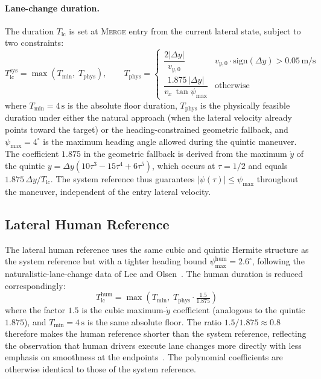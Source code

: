 \documentclass[12pt,a4paper,oneside]{report}
\begin{document}
\paragraph{Lane-change duration.} The duration $T_{\text{lc}}$ is set at \textsc{Merge} entry from the current lateral state, subject to two constraints:
\begin{equation}
T_{\text{lc}}^{\text{sys}} = \max\!\left( T_{\min}, \; T_{\text{phys}} \right), \qquad T_{\text{phys}} = \begin{cases}
\dfrac{2 |\Delta y|}{v_{y,0}} & v_{y,0} \cdot \mathrm{sign}(\Delta y) > 0.05\,\mathrm{m/s} \\[6pt]
\dfrac{1.875 \, |\Delta y|}{v_x \, \tan \psi_{\max}} & \text{otherwise}
\end{cases}
\label{eq:tlc_selection}
\end{equation}
where $T_{\min} = 4\,\mathrm{s}$ is the absolute floor duration, $T_{\text{phys}}$ is the physically feasible duration under either the natural approach (when the lateral velocity already points toward the target) or the heading-constrained geometric fallback, and $\psi_{\max} = 4^\circ$ is the maximum heading angle allowed during the quintic maneuver. The coefficient $1.875$ in the geometric fallback is derived from the maximum $\dot{y}$ of the quintic $y = \Delta y (10\tau^3 - 15\tau^4 + 6\tau^5)$, which occurs at $\tau = 1/2$ and equals $1.875 \, \Delta y / T_{\text{lc}}$. The system reference thus guarantees $|\psi(\tau)| \leq \psi_{\max}$ throughout the maneuver, independent of the entry lateral velocity.

\subsection{Lateral Human Reference}
\label{sec:lat_human_ref}

The lateral human reference uses the same cubic and quintic Hermite structure as the system reference but with a tighter heading bound $\psi_{\max}^{\text{hum}} = 2.6^\circ$, following the naturalistic-lane-change data of Lee and Olsen~\cite{leeComprehensiveExaminationNaturalistic2004a}. The human duration is reduced correspondingly:
\begin{equation}
T_{\text{lc}}^{\text{hum}} = \max\!\left( T_{\min}, \; T_{\text{phys}} \cdot \tfrac{1.5}{1.875} \right)
\label{eq:tlc_human}
\end{equation}
where the factor $1.5$ is the cubic maximum-$\dot{y}$ coefficient (analogous to the quintic $1.875$), and $T_{\min} = 4\,\mathrm{s}$ is the same absolute floor. The ratio $1.5 / 1.875 \approx 0.8$ therefore makes the human reference shorter than the system reference, reflecting the observation that human drivers execute lane changes more directly with less emphasis on smoothness at the endpoints~\cite{guHumanlikeMotionPlanning2014, hoffmannAutonomousAutomobileTrajectory2007}. The polynomial coefficients are otherwise identical to those of the system reference.
\end{document}
